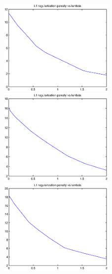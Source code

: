 \documentclass{article}
\theoremstyle{definition}
\theoremstyle{definition}
\theoremstyle{remark}
\begin{document}
\begin{figure}[!htbp]
\begin{minipage}[t]{0.3\linewidth}
\centering
\includegraphics[width=2.2in]{s2.eps}
\end{minipage}%
\begin{minipage}[t]{0.3\linewidth}
\centering
\includegraphics[width=2.2in]{m2.eps}
\end{minipage}
\begin{minipage}[t]{0.3\linewidth}
\centering
\includegraphics[width=2.2in]{l2.eps}
\end{minipage}
\end{figure}
\end{document}
